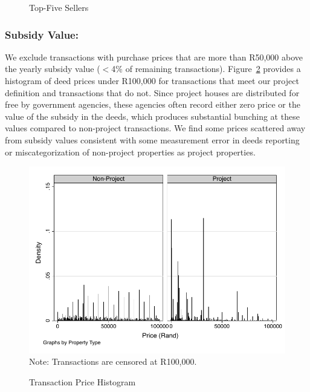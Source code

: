 \documentclass[12pt]{article}
\begin{document}
\begin{figure}
\caption{Top-Five Sellers}\label{figure:topfivesellers}
\centering

\end{figure}


\subsubsection{Subsidy Value:}

We exclude transactions with purchase prices that are more than R50,000 above the yearly subsidy value ($<$4\% of remaining transactions).  Figure~\ref{figure:transactionhist} provides a histogram of deed prices under R100,000 for transactions that meet our project definition and transactions that do not.  Since project houses are distributed for free by government agencies, these agencies often record either zero price or the value of the subsidy in the deeds, which produces substantial bunching at these values compared to non-project transactions.  We find some prices scattered away from subsidy values consistent with some measurement error in deeds reporting or miscategorization of non-project properties as project properties.  


\begin{figure}
\caption{Transaction Price Histogram}\label{figure:transactionhist}
\centering
\includegraphics[scale=1]{figures/price_histogram.pdf}\\
Note: Transactions are censored at R100,000.
\end{figure}
\end{document}
